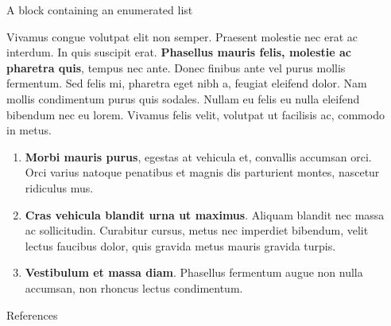 \documentclass[final]{beamer}
\newlength{\sepwidth}
\newlength{\colwidth}
\newcommand{\separatorcolumn}{\begin{column}{\sepwidth}\end{column}}
\begin{document}
\begin{frame}[t]
\begin{columns}[t]
\begin{column}{\colwidth}
  \begin{block}{A block containing an enumerated list}

    Vivamus congue volutpat elit non semper. Praesent molestie nec erat ac
    interdum. In quis suscipit erat. \textbf{Phasellus mauris felis, molestie
    ac pharetra quis}, tempus nec ante. Donec finibus ante vel purus mollis
    fermentum. Sed felis mi, pharetra eget nibh a, feugiat eleifend dolor. Nam
    mollis condimentum purus quis sodales. Nullam eu felis eu nulla eleifend
    bibendum nec eu lorem. Vivamus felis velit, volutpat ut facilisis ac,
    commodo in metus.

    \begin{enumerate}
      \item \textbf{Morbi mauris purus}, egestas at vehicula et, convallis
        accumsan orci. Orci varius natoque penatibus et magnis dis parturient
        montes, nascetur ridiculus mus.
      \item \textbf{Cras vehicula blandit urna ut maximus}. Aliquam blandit nec
        massa ac sollicitudin. Curabitur cursus, metus nec imperdiet bibendum,
        velit lectus faucibus dolor, quis gravida metus mauris gravida turpis.
      \item \textbf{Vestibulum et massa diam}. Phasellus fermentum augue non
        nulla accumsan, non rhoncus lectus condimentum.
    \end{enumerate}

  \end{block}

  \begin{block}{References}

    \nocite{*}
    \footnotesize{}

  \end{block}

  \end{column}
  \separatorcolumn
  \end{columns}

\end{frame}

\else
\end{document}
